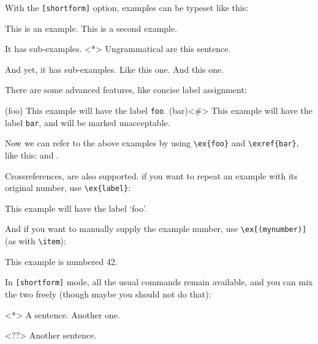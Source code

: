 \documentclass{article}
\begin{document}
%
\noindent With the \verb|[shortform]| option, examples can be typeset like this:
    \begin{exe}
        \ex This is an example.
        \ex This is a second example.
              \begin{exe}
                  \ex It has sub-examples.
                  \ex<*> Ungrammatical are this sentence.
                        \begin{exe}
                            \ex And yet, it has sub-examples. Like this one.
                            \ex And this one.
                        \end{exe}
              \end{exe}
    \end{exe}
There are some advanced features, like concise label assignment:
\begin{exe}
    \ex(foo) This example will have the label \verb|foo|.
    \ex(bar)<\#> This example will have the label \verb|bar|, and will be marked 
                unacceptable.
\end{exe}
%
Now we can refer to the above examples by using \verb|\ex{foo}| and \verb|\exref{bar}|, like this:  and .

Crossreferences, are also supported. if you want to repeat an example with its original 
number, use \verb|\ex{label}|:
\begin{exe}
     This example will have the label `foo'.
\end{exe}
%
And if you want to manually supply the example number, use \verb|\ex[(mynumber)]| (as with \verb|\item|):
\begin{exe}
    \ex[(42)] This example is numbered 42.
\end{exe}
%
In \verb|[shortform]| mode, all the usual commands remain available, 
and you can mix the two freely (though maybe you should not do that):
\begin{exe}
  \item<*> A sentence.
  \ex Another one.
\end{exe}
\begin{examples}
  \ex<??> Another sentence.
\end{examples}
\end{document}
